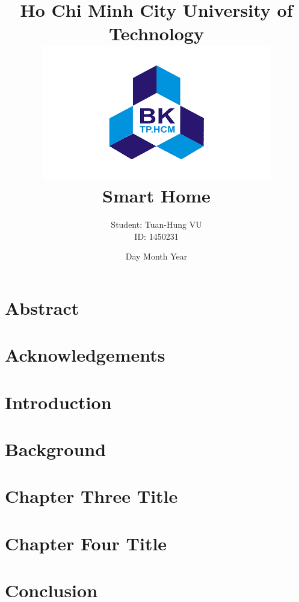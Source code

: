 \documentclass[12pt]{report}
\title{
    {\huge Ho Chi Minh City University of Technology}\\
    {\includegraphics[width=100mm, scale=0.7]{BK_logo.png}}\\
    {\huge Smart Home}\\
}
\author{Student: Tuan-Hung VU\\ID: 1450231}
\date{Day Month Year}
\begin{document}
\maketitle
\chapter*{Abstract}


\chapter*{Acknowledgements}


\tableofcontents
{%
\let\oldnumberline\numberline%
\renewcommand{\numberline}{\figurename~\oldnumberline}%
\listoffigures%
}
\listoftables
\printglossary[title={Acronym and Abbreviation}]
\newpage
\setcounter{page}{1}
\chapter{Introduction}

 
\chapter{Background}

% 
 
\chapter{Chapter Three Title}

 
\chapter{Chapter Four Title}

 
\chapter{Conclusion}

\end{document}
